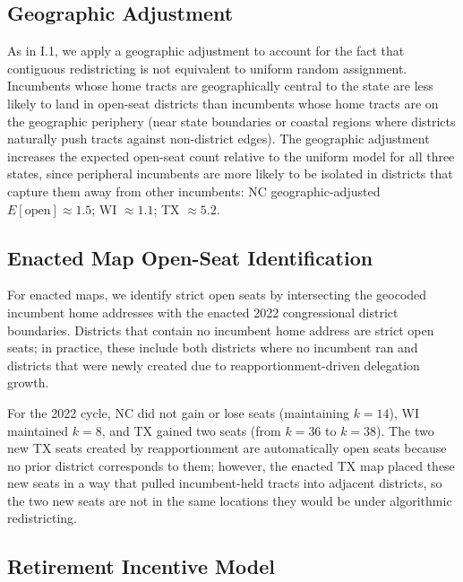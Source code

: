 \subsection{Geographic Adjustment}

As in I.1, we apply a geographic adjustment to account for the fact that contiguous
redistricting is not equivalent to uniform random assignment. Incumbents whose home
tracts are geographically central to the state are less likely to land in open-seat
districts than incumbents whose home tracts are on the geographic periphery (near state
boundaries or coastal regions where districts naturally push tracts against non-district
edges). The geographic adjustment increases the expected open-seat count relative to
the uniform model for all three states, since peripheral incumbents are more likely to
be isolated in districts that capture them away from other incumbents:
NC geographic-adjusted $E[\text{open}] \approx 1.5$; WI $\approx 1.1$; TX $\approx 5.2$.

\subsection{Enacted Map Open-Seat Identification}

For enacted maps, we identify strict open seats by intersecting the geocoded incumbent
home addresses with the enacted 2022 congressional district boundaries. Districts that
contain no incumbent home address are strict open seats; in practice, these include
both districts where no incumbent ran and districts that were newly created due to
reapportionment-driven delegation growth.

For the 2022 cycle, NC did not gain or lose seats (maintaining $k=14$), WI maintained
$k=8$, and TX gained two seats (from $k=36$ to $k=38$). The two new TX seats created
by reapportionment are automatically open seats because no prior district corresponds
to them; however, the enacted TX map placed these new seats in a way that pulled
incumbent-held tracts into adjacent districts, so the two new seats are not in the same
locations they would be under algorithmic redistricting.

\subsection{Retirement Incentive Model}

